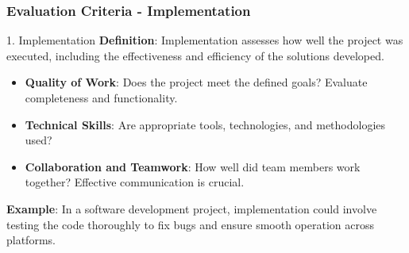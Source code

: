 \documentclass[aspectratio=169]{beamer}
\begin{document}
\begin{frame}[fragile]
    \frametitle{Evaluation Criteria - Implementation}
    \begin{block}{1. Implementation}
        \textbf{Definition}: Implementation assesses how well the project was executed, including the effectiveness and efficiency of the solutions developed.
        
        \begin{itemize}
            \item \textbf{Quality of Work}: Does the project meet the defined goals? Evaluate completeness and functionality.
            \item \textbf{Technical Skills}: Are appropriate tools, technologies, and methodologies used? 
            \item \textbf{Collaboration and Teamwork}: How well did team members work together? Effective communication is crucial.
        \end{itemize}
        
        \textbf{Example}: In a software development project, implementation could involve testing the code thoroughly to fix bugs and ensure smooth operation across platforms.
    \end{block}
\end{frame}
\end{document}
